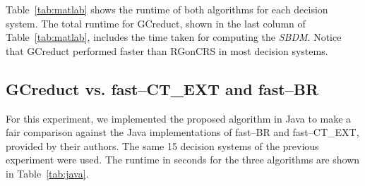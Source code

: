 \documentclass[number,preprint,review,12pt]{elsarticle}
\begin{document}
	Table~\ref{tab:matlab} shows the runtime of both algorithms for each decision system. The total runtime for GCreduct, shown in the last column of Table~\ref{tab:matlab}, includes the time taken for computing the \textit{SBDM}. Notice that GCreduct performed faster than RGonCRS in most decision systems.

\subsection{GCreduct vs. fast--CT\_EXT and fast--BR}\label{sub:java}
	
	For this experiment, we implemented the proposed algorithm in Java to make a fair comparison against the Java implementations of fast--BR and fast--CT\_EXT, provided by their authors. The same 15 decision systems of the previous experiment were used. The runtime in seconds for the three algorithms are shown in Table~\ref{tab:java}.
	
\end{document}
